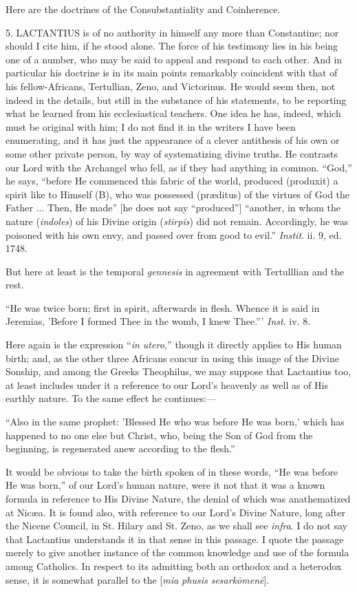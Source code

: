 Here are the doctrines of the Consubstantiality and Coinherence.

5. LACTANTIUS is of no authority in himself
any more than Constantine; nor should I cite him, if he stood alone.
The force of his testimony lies in his being one of a number, who may
be said to appeal and respond to each other. And in particular his
doctrine is in its main points remarkably coincident with that of his
fellow-Africans, Tertullian, Zeno, and Victorinus. He would seem then,
not indeed in the details, but still in the substance of his
statements, to be reporting what he learned from his ecclesiastical
teachers. One idea he has, indeed, which must be original with him; I
do not find it in the writers I have been enumerating, and it has just
the appearance of a clever antithesis of his own or some other private
person, by way of systematizing divine truths. He contrasts our Lord
with the Archangel who fell, as if they had anything in common.
``God,'' he says, ``before He commenced this fabric of the
world, produced (produxit) a spirit like to Himself (B), who was
possessed (præditus) of the virtues of God the Father ... Then, He
made'' [he does not say ``produced''] ``another, in
whom the nature (\emph{indoles}) of his Divine origin (\emph{stirpis})
did not remain. Accordingly, he was poisoned with his own envy, and
passed over from good to evil.'' \emph{Instit}. ii. 9, ed. 1748.

But here at least is the temporal \emph{gennesis} in agreement with
Tertulllian and the rest.

``He was twice born; first in spirit, afterwards in flesh.
Whence it is said in Jeremias, 'Before I formed Thee in the womb, I
knew Thee.''' \emph{Inst}. iv. 8.

Here again is the expression ``\emph{in utero,}'' though it
directly applies to His human birth; and, as the other three Africans
concur in using this image of the Divine Sonship, and among the Greeks
Theophilus, we may suppose that Lactantius too, at least includes
under it a reference to our Lord's heavenly as well as of His earthly
nature. To the same effect he continues:—

``Also in the same prophet: 'Blessed He who was before He was
born,' which has happened to no one else but Christ, who, being the
Son of God from the beginning, is regenerated anew according to the
flesh.''

It would be obvious to take the birth spoken of in these words,
``He was before He was born,'' of our Lord's human nature,
were it not that it was a known formula in reference to His Divine
Nature, the denial of which was anathematized at Nicæa. It is found
also, with reference to our Lord's Divine Nature, long after the
Nicene Council, in St. Hilary and St. Zeno, as we shall see \emph{infra}.
I do not say that Lactantius understands it in that sense in this
passage. I quote the passage merely to give another instance of the
common knowledge and use of the formula among Catholics. In respect to
its admitting both an orthodox and a heterodox sense, it is somewhat
parallel to the [\emph{mia phusis sesark\={o}men\={e}}].


